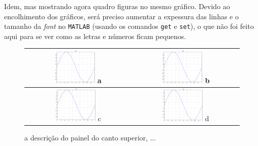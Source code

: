 \documentclass[11pt,twoside,a4paper]{report}
\begin{document}
Idem, mas mostrando agora quadro figuras no mesmo gr\'afico. Devido ao encolhimento dos
gr\'aficos, ser\'a preciso aumentar a expessura das linhas e o tamanho da \textit{font} no
\texttt{MATLAB} (usando os comandos \verb+get+ e \verb+set+), o que n\~ao foi feito aqui para se
ver como as letras e n\'umeros ficam pequenos.
\begin{figure}
  \centering
  \begin{tabular}{|c|c|}
    \hline
      \includegraphics[width=0.4\textwidth]{example_fig.eps} a &
      \includegraphics[width=0.4\textwidth]{example_fig.eps} b \\
    \hline
      \includegraphics[width=0.4\textwidth]{example_fig.eps} c &
      \includegraphics[width=0.4\textwidth]{example_fig.eps} d \\
    \hline
  \end{tabular}
  \caption{a descri\c c\~ao do painel do canto superior, $\ldots$}
\label{f:seno2}
\end{figure}
\end{document}

